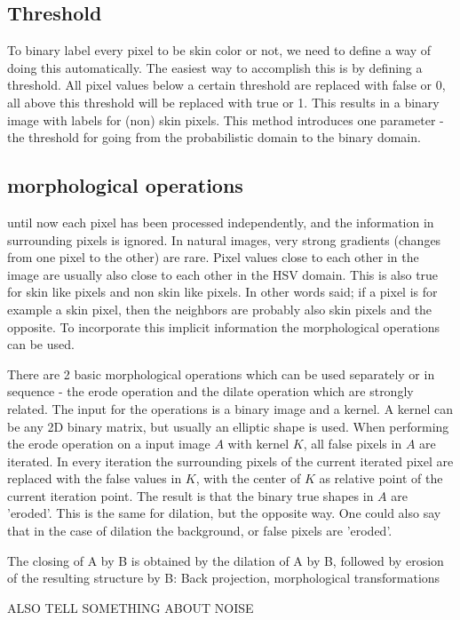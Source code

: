 \subsection*{Threshold}
To binary label every pixel to be skin color or not, we need to define a way of doing this automatically. The easiest way to accomplish this is by defining a threshold. All pixel values below a certain threshold are replaced with false or 0, all above this threshold will be replaced with true or 1. This results in a binary image with labels for (non) skin pixels. This method introduces one parameter - the threshold for going from the probabilistic domain to the binary domain.

\subsection*{morphological operations}
until now each pixel has been processed independently, and the information in surrounding pixels is ignored. In natural images, very strong gradients (changes from one pixel to the other) are rare. Pixel values close to each other in the image are usually also close to each other in the HSV domain. This is also true for skin like pixels and non skin like pixels. In other words said; if a pixel is for example a skin pixel, then the neighbors are probably also skin pixels and the opposite. To incorporate this implicit information the morphological operations can be used.

There are 2 basic morphological operations which can be used separately or in sequence - the erode operation and the dilate operation which are strongly related. The input for the operations is a binary image and a kernel. A kernel can be any 2D binary matrix, but usually an elliptic shape is used. When performing the erode operation on a input image $A$ with kernel $K$, all false pixels in $A$ are iterated. In every iteration the surrounding pixels of the current iterated pixel are replaced with the false values in $K$, with the center of $K$ as relative point of the current iteration point. The result is that the binary true shapes in $A$ are 'eroded'. This is the same for dilation, but the opposite way. One could also say that in the case of dilation the background, or false pixels are 'eroded'.

The closing of A by B is obtained by the dilation of A by B, followed by erosion of the resulting structure by B:
Back projection, morphological transformations

ALSO TELL SOMETHING ABOUT NOISE

